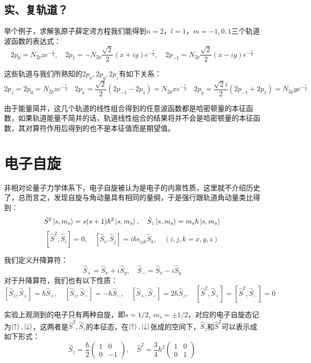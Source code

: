 \subsection{实、复轨道？}
举个例子，求解氢原子薛定谔方程我们能得到$n=2$，$l=1$，$m=-1,0,1$三个轨道波函数的表达式：
\[2p_0=N_{2p}ze^{-\frac{r}{2}}, \quad 2p_1=-N_{2p}\frac{\sqrt{2}}{2}(x+iy)e^{-\frac{r}{2}}, \quad 2p_{-1}=N_{2p}\frac{\sqrt{2}}{2}(x-iy)e^{-\frac{r}{2}}\]

这些轨道与我们所熟知的$2p_x,2p_y,2p_z$有如下关系：
\[2p_z=2p_0=N_{2p}ze^{-\frac{r}{2}} \quad 2p_x=\frac{\sqrt{2}}{2}(2p_{-1}-2p_1)=N_{2p}xe^{-\frac{r}{2}} \quad 2p_y=\frac{\sqrt{2}i}{2}(2p_{-1}+2p_1)=N_{2p}ye^{-\frac{r}{2}}\]

由于能量简并，这几个轨道的线性组合得到的任意波函数都是哈密顿量的本征函数，如果轨道能量不简并的话，轨道线性组合的结果将并不会是哈密顿量的本征函数，其对算符作用后得到的也不是本征值而是期望值。

\section{电子自旋}
非相对论量子力学体系下，电子自旋被认为是电子的内禀性质，这里就不介绍历史了，总而言之，发现自旋与角动量具有相同的量纲，于是强行跟轨道角动量类比得到：
\[\hat{S}^2\ket{s,m_s}=s(s+1)\hbar^2\ket{s,m_s}, \quad \hat{S}_z\ket{s,m_s}=m_s\hbar\ket{s,m_s}\]
\[[\hat{S}^2,\hat{S}_i]=0, \quad [\hat{S}_i,\hat{S}_j]=i\hbar\epsilon_{ijk}\hat{S}_k, \quad (i,j,k=x,y,z)\]

我们定义升降算符：
\[\hat{S}_+=\hat{S}_x+i\hat{S}_y, \quad \hat{S}_-=\hat{S}_x-i\hat{S}_y\]
对于升降算符，我们也有以下性质：
\[[\hat{S}_z,\hat{S}_+]=\hbar\hat{S}_+, \quad [\hat{S}_z,\hat{S}_-]=-\hbar\hat{S}_-, \quad [\hat{S}_+,\hat{S}_-]=2\hbar\hat{S}_z, \quad [\hat{S}^2,\hat{S}_+]=[\hat{S}^2,\hat{S}_-]=0\]

实验上观测到的电子只有两种自旋，即$s=1/2, \ m_s=\pm1/2$，对应的电子自旋态记为$\ket{\uparrow},\ket{\downarrow}$，这两者是$\hat{S}^2,\hat{S}_z$的本征态，在$\ket{\uparrow},\ket{\downarrow}$张成的空间下，$\hat{S}_z$和$\hat{S}^2$可以表示成如下形式：
\[\hat{S}_z=\frac{\hbar}{2}\begin{pmatrix} 1 & 0 \\ 0 & -1 \end{pmatrix}, \quad \hat{S}^2=\frac{3}{4}\hbar^2\begin{pmatrix} 1 & 0 \\ 0 & 1 \end{pmatrix}\]

